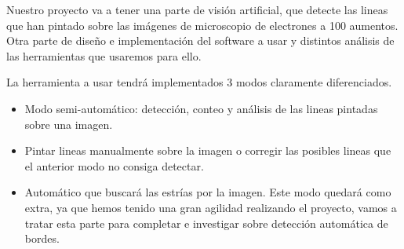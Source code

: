 Nuestro proyecto va a tener una parte de visión artificial, que detecte las lineas que han pintado sobre las imágenes de microscopio de electrones a 100 aumentos. Otra parte de diseño e implementación del software a usar y distintos análisis de las herramientas que usaremos para ello.

La herramienta a usar tendrá implementados 3 modos claramente diferenciados.

\begin{itemize}
\item Modo semi-automático: detección, conteo y análisis de las lineas pintadas sobre una imagen.
\item Pintar lineas manualmente sobre la imagen o corregir las posibles lineas que el anterior modo no consiga detectar.
\item Automático que buscará las estrías por la imagen. Este modo quedará como extra, ya que hemos tenido una gran agilidad realizando el proyecto, vamos a tratar esta parte para completar e investigar sobre detección automática de bordes.
\end{itemize}








 